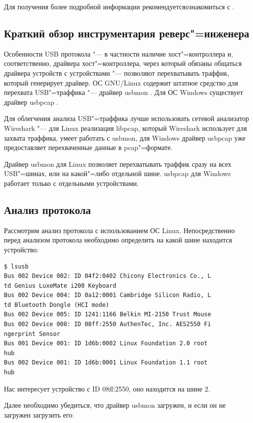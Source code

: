 \documentclass[10pt, a5paper]{article}
\begin{document}
Для получения более подробной информации рекомендуется\linebreak ознакомиться с \cite{Anar1}.

\subsection*{Краткий обзор инструментария реверс"=инженера}

Особенности USB протокола "--- в частности наличие хост"=контроллера и, соответственно, драйвера хост"=контроллера, через который обязаны общаться драйвера устройств с устройствами "--- позволяют перехватывать траффик, который генерирует драйвер. ОС GNU/Linux содержит штатное средство для перехвата USB"=траффика "--- драйвер usbmon \cite{Anar2}. Для ОС Windows существует драйвер usbpcap \cite{Anar3}.

Для облегчения анализа USB"=траффика лучше использовать сетевой анализатор Wireshark "--- для Linux реализация libpcap, который Wireshark использует для захвата траффика, умеет работать с usbmon, для Windows драйвер usbpcap уже предоставляет перехваченные данные в pcap"=формате.

Драйвер usbmon для Linux позволяет перехватывать траффик сразу на всех USB"=шинах, или на какой"=либо отдельной шине. \linebreak usbpcap для Windows работает только с отдельными устройствами.

\subsection*{Анализ протокола}

Рассмотрим анализ протокола с использованием ОС Linux. Непосредственно перед анализом протокола необходимо определить на какой шине находится устройство:

\begin{verbatim}
$ lsusb
Bus 002 Device 002: ID 04f2:0402 Chicony Electronics Co., L
td Genius LuxeMate i200 Keyboard
Bus 002 Device 004: ID 0a12:0001 Cambridge Silicon Radio, L
td Bluetooth Dongle (HCI mode)
Bus 002 Device 005: ID 1241:1166 Belkin MI-2150 Trust Mouse
Bus 002 Device 008: ID 08ff:2550 AuthenTec, Inc. AES2550 Fi
ngerprint Sensor
Bus 001 Device 001: ID 1d6b:0002 Linux Foundation 2.0 root 
hub
Bus 002 Device 001: ID 1d6b:0001 Linux Foundation 1.1 root 
hub
\end{verbatim}
Нас интересует устройство с ID 08ff:2550, оно находится на шине 2.

Далее необходимо убедиться, что драйвер usbmon загружен, и если он не загружен загрузить его:
\end{document}

